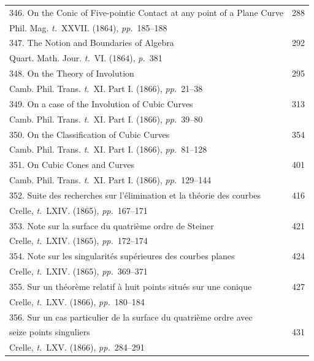 \documentclass[11pt,a4paper]{article}
\newcommand{\tome}{\textit{t.}}
\newcommand{\page}{\textit{p.}}
\newcommand{\pages}{\textit{pp.}}
\begin{document}
\begin{longtable}{p{4.5in}r}
346. On the Conic of Five-pointic Contact at any point of a Plane Curve & 288 \\[-0.3em]
\multicolumn{2}{l}{\quad\small Phil. Mag. \tome~XXVII. (1864), \pages~185--188} \\[0.5em]

347. The Notion and Boundaries of Algebra & 292 \\[-0.3em]
\multicolumn{2}{l}{\quad\small Quart. Math. Jour. \tome~VI. (1864), \page~381} \\[0.5em]

348. On the Theory of Involution & 295 \\[-0.3em]
\multicolumn{2}{l}{\quad\small Camb. Phil. Trans. \tome~XI. Part I. (1866), \pages~21--38} \\[0.5em]

349. On a case of the Involution of Cubic Curves & 313 \\[-0.3em]
\multicolumn{2}{l}{\quad\small Camb. Phil. Trans. \tome~XI. Part I. (1866), \pages~39--80} \\[0.5em]

350. On the Classification of Cubic Curves & 354 \\[-0.3em]
\multicolumn{2}{l}{\quad\small Camb. Phil. Trans. \tome~XI. Part I. (1866), \pages~81--128} \\[0.5em]

351. On Cubic Cones and Curves & 401 \\[-0.3em]
\multicolumn{2}{l}{\quad\small Camb. Phil. Trans. \tome~XI. Part I. (1866), \pages~129--144} \\[0.5em]

352. Suite des recherches sur l'\'{e}limination et la th\'{e}orie des courbes & 416 \\[-0.3em]
\multicolumn{2}{l}{\quad\small Crelle, \tome~LXIV. (1865), \pages~167--171} \\[0.5em]

353. Note sur la surface du quatri\`{e}me ordre de Steiner & 421 \\[-0.3em]
\multicolumn{2}{l}{\quad\small Crelle, \tome~LXIV. (1865), \pages~172--174} \\[0.5em]

354. Note sur les singularit\'{e}s sup\'{e}rieures des courbes planes & 424 \\[-0.3em]
\multicolumn{2}{l}{\quad\small Crelle, \tome~LXIV. (1865), \pages~369--371} \\[0.5em]

355. Sur un th\'{e}or\`{e}me relatif \`{a} huit points situ\'{e}s sur une conique & 427 \\[-0.3em]
\multicolumn{2}{l}{\quad\small Crelle, \tome~LXV. (1866), \pages~180--184} \\[0.5em]

\multicolumn{2}{l}{356. Sur un cas particulier de la surface du quatri\`{e}me ordre avec} \\[-0.3em]
\quad seize points singuliers & 431 \\[-0.3em]
\multicolumn{2}{l}{\quad\small Crelle, \tome~LXV. (1866), \pages~284--291} \\[0.5em]
\end{longtable}
\end{document}
